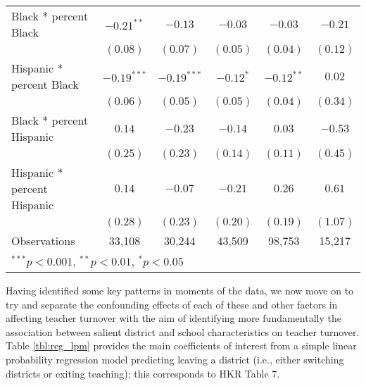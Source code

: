 \documentclass[12pt,]{article}
\begin{document}
\begin{sidewaystable}
\begin{center}
\begin{tabular}{l c c c c c }
\quad Black * percent Black                 & $-0.21^{**}$  & $-0.13$       & $-0.03$       & $-0.03$      & $-0.21$     \\
                                            & $(0.08)$      & $(0.07)$      & $(0.05)$      & $(0.04)$     & $(0.12)$    \\
\quad Hispanic * percent Black              & $-0.19^{***}$ & $-0.19^{***}$ & $-0.12^{*}$   & $-0.12^{**}$ & $0.02$      \\
                                            & $(0.06)$      & $(0.05)$      & $(0.05)$      & $(0.04)$     & $(0.34)$    \\
\quad Black * percent Hispanic              & $0.14$        & $-0.23$       & $-0.14$       & $0.03$       & $-0.53$     \\
                                            & $(0.25)$      & $(0.23)$      & $(0.14)$      & $(0.11)$     & $(0.45)$    \\
\quad Hispanic * percent Hispanic           & $0.14$        & $-0.07$       & $-0.21$       & $0.26$       & $0.61$      \\
                                            & $(0.28)$      & $(0.23)$      & $(0.20)$      & $(0.19)$     & $(1.07)$    \\
\hline
Observations                                & 33,108         & 30,244         & 43,509         & 98,753        & 15,217       \\
\hline
\multicolumn{6}{l}{\scriptsize{$^{***}p<0.001$, $^{**}p<0.01$, $^*p<0.05$}}
\end{tabular}
\caption{Estimated Effects of Starting Teacher Salary and Student Demographic Characteristics on the Probability that Teachers Leave School Districts, by Experience (linear probability models; Huber-White standard  errors in parentheses)}
\label{tbl:reg_lpm}
\end{center}
\end{sidewaystable}

Having identified some key patterns in moments of the data, we now move
on to try and separate the confounding effects of each of these and
other factors in affecting teacher turnover with the aim of identifying
more fundamentally the association between salient district and school
characteristics on teacher turnover. Table \ref{tbl:reg_lpm} provides
the main coefficients of interest from a simple linear probability
regression model predicting leaving a district (i.e., either switching
districts or exiting teaching); this corresponds to HKR Table 7.
\end{document}
